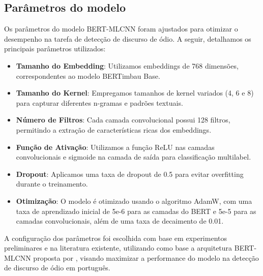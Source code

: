 \documentclass[sigconf,nonacm]{acmart}
\begin{document}
\subsection{Parâmetros do modelo}
Os parâmetros do modelo BERT-MLCNN foram ajustados para otimizar o desempenho na tarefa de detecção de discurso de ódio. 
A seguir, detalhamos os principais parâmetros utilizados:

\begin{itemize}
  \item \textbf{Tamanho do Embedding}: Utilizamos embeddings de 768 dimensões, correspondentes ao modelo BERTimbau Base.
  \item \textbf{Tamanho do Kernel}: Empregamos tamanhos de kernel variados (4, 6 e 8) para capturar diferentes n-gramas e padrões textuais.
  \item \textbf{Número de Filtros}: Cada camada convolucional possui 128 filtros, permitindo a extração de características ricas dos embeddings.
  \item \textbf{Função de Ativação}: Utilizamos a função ReLU nas camadas convolucionais e sigmoide na camada de saída para classificação multilabel.
  \item \textbf{Dropout}: Aplicamos uma taxa de dropout de 0.5 para evitar overfitting durante o treinamento.
  \item \textbf{Otimização}: O modelo é otimizado usando o algoritmo AdamW, com uma taxa de aprendizado inicial de 5e-6 para as camadas do 
  BERT e 5e-5 para as camadas convolucionais, além de uma taxa de decaimento de 0.01.
  \end{itemize}

A configuração dos parâmetros foi escolhida com base em experimentos preliminares e na literatura existente, 
utilizando como base a arquitetura BERT-MLCNN proposta por \cite{ATANDOH2023101578}, visando maximizar a performance do modelo na detecção de discurso de ódio em português.
\end{document}
